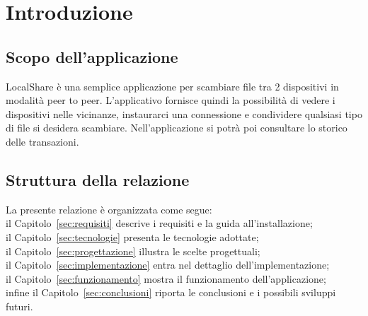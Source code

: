\section{Introduzione}

\subsection{Scopo dell'applicazione}
LocalShare è una semplice applicazione per scambiare file tra 2 dispositivi in modalità peer to peer.
L'applicativo fornisce quindi la possibilità di vedere i dispositivi nelle vicinanze,
instaurarci una connessione e condividere qualsiasi tipo di file si desidera scambiare.
Nell'applicazione si potrà poi consultare lo storico delle transazioni.


\subsection{Struttura della relazione}
La presente relazione è organizzata come segue:\\ 
il Capitolo~\ref{sec:requisiti} descrive i requisiti e la guida all'installazione;\\ 
il Capitolo~\ref{sec:tecnologie} presenta le tecnologie adottate;\\ 
il Capitolo~\ref{sec:progettazione} illustra le scelte progettuali;\\ 
il Capitolo~\ref{sec:implementazione} entra nel dettaglio dell'implementazione;\\ 
il Capitolo~\ref{sec:funzionamento} mostra il funzionamento dell'applicazione;\\ 
infine il Capitolo~\ref{sec:conclusioni} riporta le conclusioni e i possibili sviluppi futuri.
